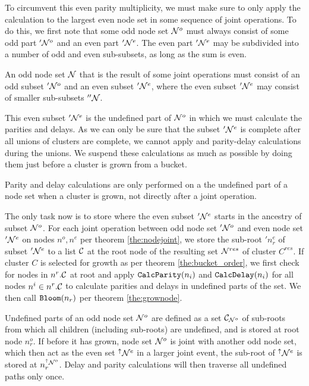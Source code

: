 To circumvent this even parity multiplicity, we must make sure to only apply the calculation to the largest even node set in some sequence of joint operations. To do this, we first note that some odd node set $\mathcal{N}^o$ must always consist of some odd part $'\mathcal{N}^o$ and an even part $'\mathcal{N}^e$. The even part $'\mathcal{N}^e$ may be subdivided into a number of odd and even sub-subsets, as long as the sum is even.
\begin{lemma}\label{lem:oddisevenodd}
  An odd node set $\mathcal{N}$ that is the result of some joint operations must consist of an odd subset $'\mathcal{N}^o$ and an even subset $'\mathcal{N}^e$, where the even subset $'\mathcal{N}^e$ may consist of smaller sub-subsets $''\mathcal{N}$.
\end{lemma}
This even subset $'\mathcal{N}^e$ is the undefined part of $\mathcal{N}^o$ in which we must calculate the parities and delays. As we can only be sure that the subset $'\mathcal{N}^e$ is complete after all unions of clusters are complete, we cannot apply and parity-delay calculations during the unions. We suspend these calculations as much as possible by doing them just before a cluster is grown from a bucket.

\begin{lemma}\label{lem:delaywhengrown}
  Parity and delay calculations are only performed on a the undefined part of a node set when a cluster is grown, not directly after a joint operation.
\end{lemma}

The only task now is to store where the even subset $'\mathcal{N}^e$ starts in the ancestry of subset $\mathcal{N}^o$.  For each joint operation between odd node set $'\mathcal{N}^o$ and even node set $'\mathcal{N}^e$ on nodes $n^o, n^e$ per theorem \ref{the:nodejoint}, we store the sub-root $'n^e_r$ of subset $'\mathcal{N}^e$ to a list $\mathcal{C}$ at the root node of the resulting set $\mathcal{N}^{res}$ of cluster $C^{res}$. If cluster $C$ is selected for growth as per theorem \ref{the:bucket_order}, we first check for nodes in ${n^r}.\mathcal{C}$ at root and apply $\texttt{CalcParity}(n_i)$ and $\texttt{CalcDelay}(n_i)$ for all nodes $n^i \in {n^r}.\mathcal{C}$ to calculate parities and delays in undefined parts of the set. We then call $\texttt{Bloom}(n_r)$ per theorem \ref{the:grownode}.

\begin{theorem}\label{the:delayonce}
  Undefined parts of an odd node set $\mathcal{N}^o$ are defined as a set $\mathcal{C}_{\mathcal{N}^o}$ of sub-roots from which all children (including sub-roots) are undefined, and is stored at root node $n^o_r$. If before it has grown, node set $\mathcal{N}^o$ is joint with another odd node set, which then act as the even set ${}^{\uparrow}\mathcal{N}^e$ in a larger joint event, the sub-root of ${}^{\uparrow}\mathcal{N}^e$ is stored at $n^{{}^{\uparrow}\mathcal{N}^o}_r$. Delay and parity calculations will then traverse all undefined paths only once.
\end{theorem}

